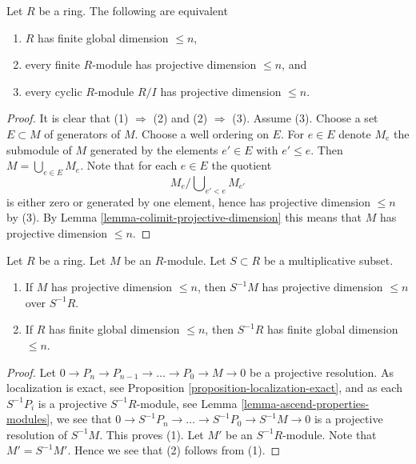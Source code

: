 \begin{lemma}
\label{lemma-finite-gl-dim}
Let $R$ be a ring. The following are equivalent
\begin{enumerate}
\item $R$ has finite global dimension $\leq n$,
\item every finite $R$-module has projective dimension $\leq n$, and
\item every cyclic $R$-module $R/I$ has projective dimension $\leq n$.
\end{enumerate}
\end{lemma}

\begin{proof}
It is clear that (1) $\Rightarrow$ (2) and (2) $\Rightarrow$ (3).
Assume (3). Choose a set $E \subset M$ of generators of $M$.
Choose a well ordering on $E$. For $e \in E$ denote
$M_e$ the submodule of $M$ generated by the elements $e' \in E$
with $e' \leq e$. Then $M = \bigcup_{e \in E} M_e$.
Note that for each $e \in E$ the quotient
$$
M_e/\bigcup\nolimits_{e' < e} M_{e'}
$$
is either zero or generated by one element, hence has projective
dimension $\leq n$ by (3). By Lemma \ref{lemma-colimit-projective-dimension}
this means that $M$ has projective dimension $\leq n$.
\end{proof}

\begin{lemma}
\label{lemma-localize-finite-gl-dim}
Let $R$ be a ring. Let $M$ be an $R$-module.
Let $S \subset R$ be a multiplicative subset.
\begin{enumerate}
\item If $M$ has projective dimension $\leq n$, then $S^{-1}M$ has
projective dimension $\leq n$ over $S^{-1}R$.
\item If $R$ has finite global dimension $\leq n$, then
$S^{-1}R$ has finite global dimension $\leq n$.
\end{enumerate}
\end{lemma}

\begin{proof}
Let $0 \to P_n \to P_{n - 1} \to \ldots \to P_0 \to M \to 0$
be a projective resolution. As localization is exact, see
Proposition \ref{proposition-localization-exact},
and as each $S^{-1}P_i$ is a projective $S^{-1}R$-module, see
Lemma \ref{lemma-ascend-properties-modules},
we see that $0 \to S^{-1}P_n \to \ldots \to S^{-1}P_0 \to S^{-1}M \to 0$
is a projective resolution of $S^{-1}M$. This proves (1).
Let $M'$ be an $S^{-1}R$-module.
Note that $M' = S^{-1}M'$.
Hence we see that (2) follows from (1).
\end{proof}










